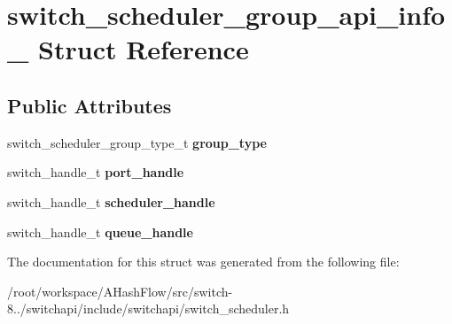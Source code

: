 \hypertarget{structswitch__scheduler__group__api__info__}{\section{switch\+\_\+scheduler\+\_\+group\+\_\+api\+\_\+info\+\_\+ Struct Reference}
\label{structswitch__scheduler__group__api__info__}
}
\subsection*{Public Attributes}
\begin{DoxyCompactItemize}
\item 
\hypertarget{structswitch__scheduler__group__api__info___a43f2f5d654b1bb870796aa54f862691f}{switch\+\_\+scheduler\+\_\+group\+\_\+type\+\_\+t {\bfseries group\+\_\+type}}\label{structswitch__scheduler__group__api__info___a43f2f5d654b1bb870796aa54f862691f}

\item 
\hypertarget{structswitch__scheduler__group__api__info___a1c2715ecc23f71c680872dbd8c28f249}{switch\+\_\+handle\+\_\+t {\bfseries port\+\_\+handle}}\label{structswitch__scheduler__group__api__info___a1c2715ecc23f71c680872dbd8c28f249}

\item 
\hypertarget{structswitch__scheduler__group__api__info___a146f6be797700604284a89cf9b1f1fe6}{switch\+\_\+handle\+\_\+t {\bfseries scheduler\+\_\+handle}}\label{structswitch__scheduler__group__api__info___a146f6be797700604284a89cf9b1f1fe6}

\item 
\hypertarget{structswitch__scheduler__group__api__info___ab0d10e1d85f5fcb4e77fe55c71f55684}{switch\+\_\+handle\+\_\+t {\bfseries queue\+\_\+handle}}\label{structswitch__scheduler__group__api__info___ab0d10e1d85f5fcb4e77fe55c71f55684}

\end{DoxyCompactItemize}


The documentation for this struct was generated from the following file\+:\begin{DoxyCompactItemize}
\item 
/root/workspace/\+A\+Hash\+Flow/src/switch-\/8../switchapi/include/switchapi/switch\+\_\+scheduler.\+h\end{DoxyCompactItemize}
